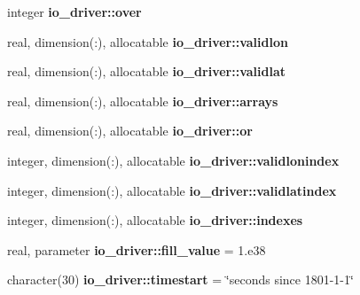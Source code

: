 \begin{DoxyCompactItemize}
\item 
\hypertarget{namespaceio__driver_a879e122a360f7e8c449b94c08a7f6ac4}{}integer {\bfseries io\+\_\+driver\+::over}\label{namespaceio__driver_a879e122a360f7e8c449b94c08a7f6ac4}

\item 
\hypertarget{namespaceio__driver_a6b647b138424e0c73174a3ef05773640}{}real, dimension(\+:), allocatable {\bfseries io\+\_\+driver\+::validlon}\label{namespaceio__driver_a6b647b138424e0c73174a3ef05773640}

\item 
\hypertarget{namespaceio__driver_a12be399bef871b63c54c69761702f576}{}real, dimension(\+:), allocatable {\bfseries io\+\_\+driver\+::validlat}\label{namespaceio__driver_a12be399bef871b63c54c69761702f576}

\item 
\hypertarget{namespaceio__driver_a0679545fe038496d3c8e7f03638e72d5}{}real, dimension(\+:), allocatable {\bfseries io\+\_\+driver\+::arrays}\label{namespaceio__driver_a0679545fe038496d3c8e7f03638e72d5}

\item 
\hypertarget{namespaceio__driver_a0f2077bc5d7238938463510744ca42dc}{}real, dimension(\+:), allocatable {\bfseries io\+\_\+driver\+::or}\label{namespaceio__driver_a0f2077bc5d7238938463510744ca42dc}

\item 
\hypertarget{namespaceio__driver_a53a8c1868dbe750b9f44b2b8879da3b0}{}integer, dimension(\+:), allocatable {\bfseries io\+\_\+driver\+::validlonindex}\label{namespaceio__driver_a53a8c1868dbe750b9f44b2b8879da3b0}

\item 
\hypertarget{namespaceio__driver_ab39d14d3f5ae1e6afbc5b76bdce93272}{}integer, dimension(\+:), allocatable {\bfseries io\+\_\+driver\+::validlatindex}\label{namespaceio__driver_ab39d14d3f5ae1e6afbc5b76bdce93272}

\item 
\hypertarget{namespaceio__driver_ae8ad87ee087202c23d052faa53c79c3f}{}integer, dimension(\+:), allocatable {\bfseries io\+\_\+driver\+::indexes}\label{namespaceio__driver_ae8ad87ee087202c23d052faa53c79c3f}

\item 
\hypertarget{namespaceio__driver_a3a9171cd2fcf056b7725b50a51fecad5}{}real, parameter {\bfseries io\+\_\+driver\+::fill\+\_\+value} = 1.e38\label{namespaceio__driver_a3a9171cd2fcf056b7725b50a51fecad5}

\item 
\hypertarget{namespaceio__driver_adbd849c7ab596533f1a66bec18b1c166}{}character(30) {\bfseries io\+\_\+driver\+::timestart} = \char`\"{}seconds since 1801-\/1-\/1\char`\"{}\label{namespaceio__driver_adbd849c7ab596533f1a66bec18b1c166}


\end{DoxyCompactItemize}
